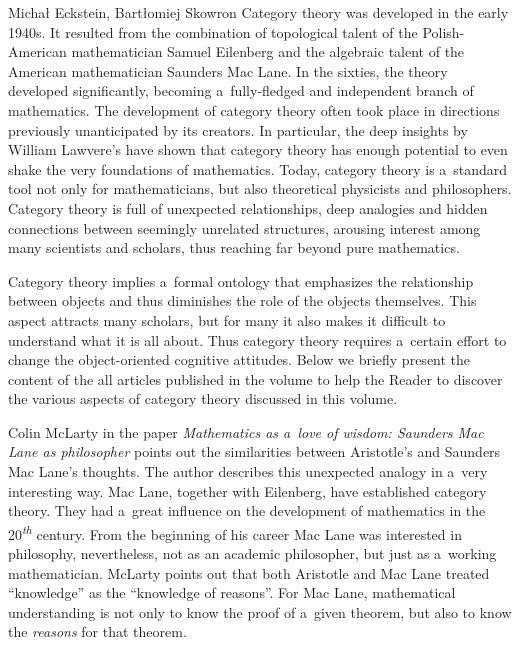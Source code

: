 \begin{editorialeng}{Michał Eckstein, Bartłomiej Skowron}
Category theory was developed in the early 1940s. It resulted from the combination of topological talent of the Polish-American mathematician Samuel Eilenberg and the algebraic talent of the American mathematician Saunders Mac Lane. In the sixties, the theory developed significantly, becoming a~fully-fledged and independent branch of mathematics. The development of category theory often took place in directions previously unanticipated by its creators. In particular, the deep insights by William Lawvere's have shown that category theory has enough potential to even shake the very foundations of mathematics. Today, category theory is a~standard tool not only for mathematicians, but also theoretical physicists and philosophers. Category theory is full of unexpected relationships, deep analogies and hidden connections between seemingly unrelated structures, arousing interest among many scientists and scholars, thus reaching far beyond pure mathematics.

Category theory implies a~formal ontology that emphasizes the relationship between objects and thus diminishes the role of the objects themselves. This aspect attracts many scholars, but for many it also makes it difficult to understand what it is all about. Thus category theory requires a~certain effort to change the object-oriented cognitive attitudes. Below we briefly present the content of the all articles published in the volume to help the Reader to discover the various aspects of category theory discussed in this volume.

Colin McLarty in the paper \textit{Mathematics as a~love of wisdom: Saunders Mac Lane as philosopher} points out the similarities between Aristotle's and Saunders Mac Lane's thoughts. The author describes this unexpected analogy in a~very interesting way. Mac Lane, together with Eilenberg, have established category theory. They had a~great influence on the development of mathematics in the 20\textit{\textsuperscript{th}} century. From the beginning of his career Mac Lane was interested in philosophy, nevertheless, not as an academic philosopher, but just as a~working mathematician. McLarty points out that both Aristotle and Mac Lane treated ``knowledge'' as the ``knowledge of reasons''. For Mac Lane, mathematical understanding is not only to know the proof of a~given theorem, but also to know the \textit{reasons} for that theorem.


\end{editorialeng}
